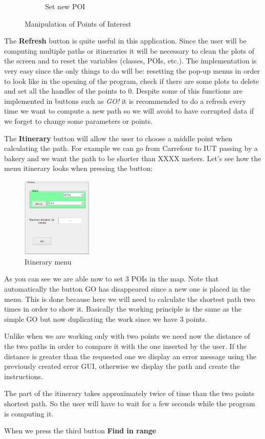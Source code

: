 \documentclass{article}
\begin{document}
\begin{figure}[h]
\begin{subfigure}[b]{0.3\textwidth}
                \caption{Set new POI}
                \label{fig:new_poi}
        \end{subfigure}
        \caption{Manipulation of Points of Interest}\label{fig:manipulation_poi}
\end{figure}

The \textbf{Refresh} button is quite useful in this application. Since the user will be computing multiple paths or itineraries it will be necessary to clean the plots of the screen and to reset the variables (classes, POIs, etc.). The implementation is very easy since the only things to do will be: resetting the pop-up menus in order to look like in the opening of the program, check if there are some plots to delete and set all the handles of the points to 0. Despite some of this functions are implemented in buttons such as \textit{GO!} it is recommended to do a refresh every time we want to compute a new path so we will avoid to have corrupted data if we forget to change some parameters or points.

The \textbf{Itinerary} button will allow the user to choose a middle point when calculating the path. For example we can go from Carrefour to IUT passing by a bakery and we want the path to be shorter than XXXX meters. Let's see how the menu itinerary looks when pressing the button:

\begin{figure}[h]
\centering
\includegraphics[width=0.3\textwidth]{itinerary}
\caption{Itinerary menu}
\label{fig:itinerary}
\end{figure}

As you can see we are able now to set 3 POIs in the map. Note that automatically the button GO has disappeared since a new one is placed in the menu. This is done because here we will need to calculate the shortest path two times in order to show it. Basically the working principle is the same as the simple GO but now duplicating the work since we have 3 points.

Unlike when we are working only with two points we need now the distance of the two paths in order to compare it with the one inserted by the user. If the distance is greater than the requested one we display an error message using the previously created error GUI, otherwise we display the path and create the instructions.

The part of the itinerary takes approximately twice of time than the two points shortest path. So the user will have to wait for a few seconds while the program is computing it.

When we press the third button \textbf{Find in range}

 
\end{document}
